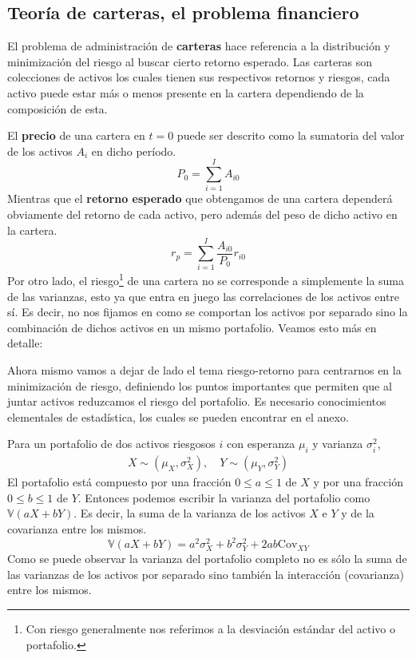 \subsection{Teoría de carteras, el problema financiero}

El problema de administración de \textbf{carteras} hace referencia a la distribución y minimización del riesgo al buscar cierto retorno esperado. Las carteras son colecciones de activos los cuales tienen sus respectivos retornos y riesgos, cada activo puede estar más o menos presente en la cartera dependiendo de la composición de esta. 

El \textbf{precio} de una cartera en $t = 0$ puede ser descrito como la sumatoria del valor de los activos $A_i$ en dicho período.
\begin{equation}
    P_0 = \sum ^{I}_{i = 1} A_{i0}
\end{equation}
Mientras que el \textbf{retorno esperado} que obtengamos de una cartera dependerá obviamente del retorno de cada activo, pero además del peso de dicho activo en la cartera. 
\begin{equation}
    r_p = \sum^{I}_{i = 1}\frac{A_{i0}}{P_0} r_{i0}
\end{equation}
Por otro lado, el riesgo\footnote{Con riesgo generalmente nos referimos a la desviación estándar del activo o portafolio.} de una cartera no se corresponde a simplemente la suma de las varianzas, esto ya que entra en juego las correlaciones de los activos entre sí. Es decir, no nos fijamos en como se comportan los activos por separado sino la combinación de dichos activos en un mismo portafolio. Veamos esto más en detalle:

Ahora mismo vamos a dejar de lado el tema riesgo-retorno para centrarnos en la minimización de riesgo, definiendo los puntos importantes que permiten que al juntar activos reduzcamos el riesgo del portafolio. Es necesario conocimientos elementales de estadística, los cuales se pueden encontrar en el anexo.

Para un portafolio de dos activos riesgosos $i$ con esperanza $\mu_i$ y varianza $\sigma^2_i$,
\begin{align*}
    X \sim (\mu_X,\sigma_X^2), \quad Y \sim(\mu_Y,\sigma_Y^2)
\end{align*}
El portafolio está compuesto por una fracción $0\leq a \leq 1$ de $X$ y por una fracción $0\leq b \leq 1$ de $Y$. Entonces podemos escribir la varianza del portafolio como $\mathbb{V}(aX + bY)$. Es decir, la suma de la varianza de los activos $X$ e $Y$ y de la covarianza entre los mismos. 
\begin{equation}
    \mathbb{V}(aX+bY) = a^2\sigma_X^2 + b^2\sigma_Y^2 + 2ab\text{Cov}_{XY} \label{eq: riesgo de portafolio suma}
\end{equation}
Como se puede observar la varianza del portafolio completo no es sólo la suma de las varianzas de los activos por separado sino también la interacción (covarianza) entre los mismos.

